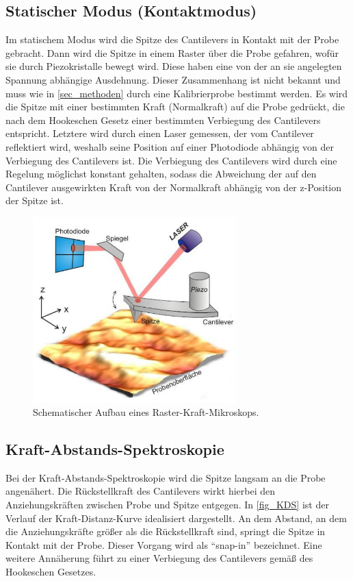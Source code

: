 \documentclass[
	a4paper,
	12pt,
	pagesize,
	ngerman
]{scrartcl}
\begin{document}
	\subsection{Statischer Modus (Kontaktmodus)}
	Im statischem Modus wird die Spitze des Cantilevers in Kontakt mit der Probe gebracht.
	Dann wird die Spitze in einem Raster über die Probe gefahren, wofür sie durch Piezokristalle bewegt wird.
	Diese haben eine von der an sie angelegten Spannung abhängige Ausdehnung.
	Dieser Zusammenhang ist nicht bekannt und muss wie in \cref{sec_methoden} durch eine Kalibrierprobe bestimmt werden.
	Es wird die Spitze mit einer bestimmten Kraft (Normalkraft) auf die Probe gedrückt, die nach dem Hookeschen Gesetz einer bestimmten Verbiegung des Cantilevers entspricht.
	Letztere wird durch einen Laser gemessen, der vom Cantilever  reflektiert wird, weshalb seine Position auf einer Photodiode abhängig von der Verbiegung des Cantilevers ist. %
	Die Verbiegung des Cantilevers wird durch eine Regelung möglichst konstant gehalten, sodass die Abweichung der auf den Cantilever ausgewirkten Kraft von der Normalkraft abhängig von der z-Position der Spitze ist.

	\begin{figure}[H]
		\includegraphics[width=0.7\textwidth]{images/sonstiges/Aufbau}
		\centering
		\caption{Schematischer Aufbau eines Raster-Kraft-Mikroskops. \cite{Anleitung}}
		\label{fig_Aufbau}
		\centering
	\end{figure}

	\subsection{Kraft-Abstands-Spektroskopie}
	Bei der Kraft-Abstands-Spektroskopie wird die Spitze langsam an die Probe angenähert.
	Die Rückstellkraft des Cantilevers wirkt hierbei den Anziehungskräften zwischen Probe und Spitze entgegen.
	In \cref{fig_KDS} ist der Verlauf der Kraft-Distanz-Kurve idealisiert dargestellt.
	An dem Abstand, an dem die Anziehungskräfte größer als die Rückstellkraft sind, springt die Spitze in Kontakt mit der Probe.
	Dieser Vorgang wird als \enquote{snap-in} bezeichnet.
	Eine weitere Annäherung führt zu einer Verbiegung des Cantilevers gemäß des Hookeschen Gesetzes.
\end{document}
